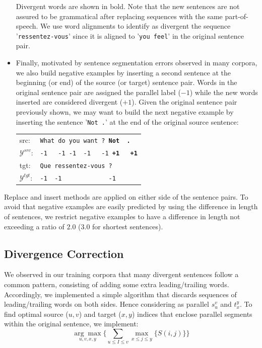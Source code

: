 \documentclass[11pt,a4paper]{article}
\begin{document}
\begin{itemize}
Divergent words are shown in bold. 
Note that the new sentences are not assured to be grammatical after replacing sequences with the same part-of-speech.
We use word alignments to identify as divergent the sequence '\texttt{ressentez-vous}' since it is aligned to '\texttt{you feel}' in the original sentence pair.

\item Finally, motivated by sentence segmentation errors observed in many corpora, we also build negative examples by inserting a second sentence at the beginning (or end) of the source (or target) sentence pair. 
Words in the original sentence pair are assigned the parallel label ($-1$) while the new words inserted are considered divergent ($+1$).
Given the original sentence pair previously shown, we may want to build the next negative example by inserting the sentence '\texttt{Not .}' at the end of the original source sentence:

\begin{table}[h]
\center
\begin{tabular}{ll}
src: & { \small \texttt{What do you want ? {\bf Not \ .}}} \\
$\mathcal{Y}^{src}$: & { \small \texttt{-1 \ \  -1 -1 \ -1  \ \ -1 {\bf +1\ \ \  +1}}} \\
tgt: & { \small \texttt{Que ressentez-vous ?}} \\
$\mathcal{Y}^{tgt}$: & { \small \texttt{-1\ \ -1\ \ \ \ \ \ \ \ \ \ \ \ \ -1}} \\
\end{tabular}
\end{table}

\end{itemize}

Replace and insert methods are applied on either side of the sentence pairs.
To avoid that negative examples are easily predicted by using the difference in length of sentences, we restrict negative examples to have a difference in length not exceeding a ratio of $2.0$ ($3.0$ for shortest sentences).

\subsection{Divergence Correction}
\label{correction}

We observed in our training corpora that many divergent sentences follow a common pattern, consisting of adding some extra leading/trailing words. %
Accordingly, we implemented a simple algorithm that discards sequences of leading/trailing words on both sides. 
Hence considering as parallel $s_u^v$ and $t_x^y$. 
To find optimal source ($u, v$) and target ($x, y$) indices that enclose parallel segments within the original sentence, we implement:
\begin{equation*}
\underset{u, v, x, y}{\arg\max} \Big \{      \underset{u \le I \le v}{\sum} \underset{x \le j \le y}{\max} \{ S(i,j) \}    \Big \}
\end{equation*}
\end{document}
